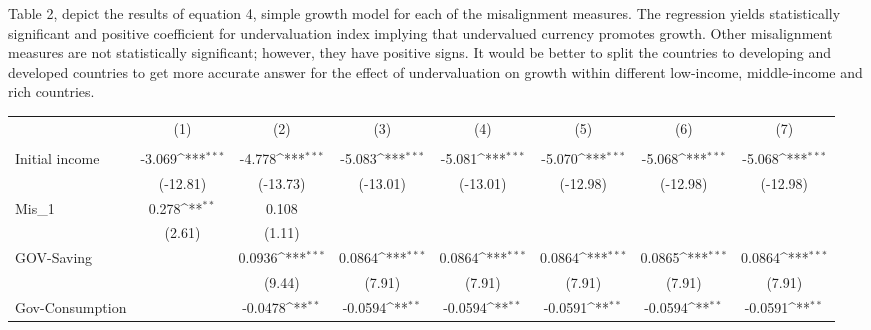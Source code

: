 \documentclass{article}
\begin{document}
Table 2, depict the results of equation 4, simple growth model for each of the misalignment measures. The regression yields statistically significant and positive coefficient for undervaluation index implying that undervalued currency promotes growth. Other misalignment measures are not statistically significant; however, they have positive signs. It would be better to split the countries to developing and developed countries to get more accurate answer for the effect of undervaluation on growth within different low-income, middle-income and rich countries.\\
{
\def\sym#1{\ifmmode^{#1}\else\(^{#1}\)\fi}
\begin{tabular}{l*{7}{c}}
\hline\hline
            &\multicolumn{1}{c}{(1)}&\multicolumn{1}{c}{(2)}&\multicolumn{1}{c}{(3)}&\multicolumn{1}{c}{(4)}&\multicolumn{1}{c}{(5)}&\multicolumn{1}{c}{(6)}&\multicolumn{1}{c}{(7)}\\
            &\multicolumn{1}{c}{}&\multicolumn{1}{c}{}&\multicolumn{1}{c}{}&\multicolumn{1}{c}{}&\multicolumn{1}{c}{}&\multicolumn{1}{c}{}&\multicolumn{1}{c}{}\\
\hline
Initial income    &      -3.069\sym{***}&      -4.778\sym{***}&      -5.083\sym{***}&      -5.081\sym{***}&      -5.070\sym{***}&      -5.068\sym{***}&      -5.068\sym{***}\\
            &    (-12.81)         &    (-13.73)         &    (-13.01)         &    (-13.01)         &    (-12.98)         &    (-12.98)         &    (-12.98)         \\
[1em]
Mis\_1       &       0.278\sym{**} &       0.108         &                     &                     &                     &                     &                     \\
            &      (2.61)         &      (1.11)         &                     &                     &                     &                     &                     \\
[1em]
GOV-Saving     &                     &      0.0936\sym{***}&      0.0864\sym{***}&      0.0864\sym{***}&      0.0864\sym{***}&      0.0865\sym{***}&      0.0864\sym{***}\\
            &                     &      (9.44)         &      (7.91)         &      (7.91)         &      (7.91)         &      (7.91)         &      (7.91)         \\
[1em]
Gov-Consumption &                     &     -0.0478\sym{**} &     -0.0594\sym{**} &     -0.0594\sym{**} &     -0.0591\sym{**} &     -0.0594\sym{**} &     -0.0591\sym{**} \\

\end{tabular}}
\end{document}
